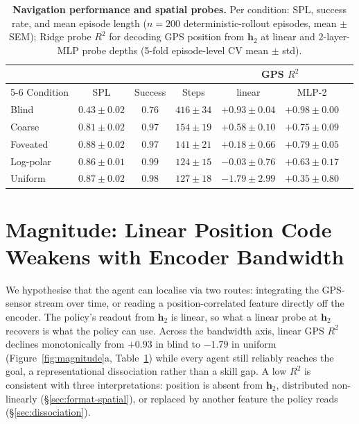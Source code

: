 \documentclass{article}
\begin{document}
\begin{table}[!t]
\centering
\small
\setlength{\tabcolsep}{6pt}
\caption{\textbf{Navigation performance and spatial probes.} Per condition: SPL, success rate, and mean episode length ($n{=}200$ deterministic-rollout episodes, mean $\pm$ SEM); Ridge probe $R^2$ for decoding GPS position from $\mathbf{h}_2$ at linear and 2-layer-MLP probe depths (5-fold episode-level CV mean $\pm$ std).}
\label{tab:summary}
\begin{tabular}{lcccccc}
\toprule
& & & & \multicolumn{2}{c}{GPS $R^2$} \\
\cmidrule(lr){5-6}
Condition & SPL & Success & Steps & linear & MLP-2 \\
\midrule
Blind                 & $0.43{\pm}0.02$           & $0.76$          & $416{\pm}34$ & $+0.93{\pm}0.04$  & $+0.98{\pm}0.00$ \\
Coarse                & $0.81{\pm}0.02$           & $0.97$          & $154{\pm}19$ & $+0.58{\pm}0.10$  & $+0.75{\pm}0.09$ \\
Foveated              & $0.88{\pm}0.02$           & $0.97$          & $141{\pm}21$ & $+0.18{\pm}0.66$  & $+0.79{\pm}0.05$ \\
Log-polar     & $0.86{\pm}0.01$           & $0.99$          & $124{\pm}15$ & $-0.03{\pm}0.76$  & $+0.63{\pm}0.17$ \\
Uniform               & $0.87{\pm}0.02$           & $0.98$          & $127{\pm}18$ & $-1.79{\pm}2.99$  & $+0.35{\pm}0.80$ \\
\bottomrule
\end{tabular}
\end{table}

\section{Magnitude: Linear Position Code Weakens with Encoder Bandwidth}
\label{sec:h1}
\label{sec:magnitude}

We hypothesise that the agent can localise via two routes: integrating the GPS-sensor stream over time, or reading a position-correlated feature directly off the encoder. The policy's readout from $\mathbf{h}_2$ is linear, so what a linear probe at $\mathbf{h}_2$ recovers is what the policy can use. Across the bandwidth axis, linear GPS $R^2$ declines monotonically from $+0.93$ in blind to $-1.79$ in uniform (Figure~\ref{fig:magnitude}a, Table~\ref{tab:summary}) while every agent still reliably reaches the goal, a representational dissociation rather than a skill gap. A low $R^2$ is consistent with three interpretations: position is absent from $\mathbf{h}_2$, distributed non-linearly (§\ref{sec:format-spatial}), or replaced by another feature the policy reads (§\ref{sec:dissociation}).
\end{document}
